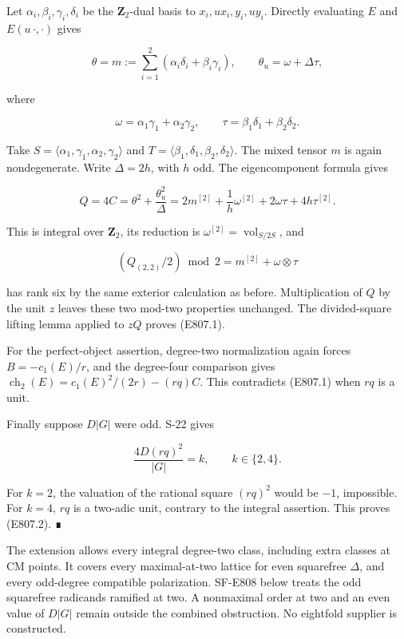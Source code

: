 Let \(\alpha_i,\beta_i,\gamma_i,\delta_i\) be the \(\mathbf Z_2\)-dual
basis to \(x_i,ux_i,y_i,uy_i\). Directly evaluating \(E\) and
\(E(u\,\cdot,\cdot)\) gives

\[
 \theta=m:=\sum_{i=1}^2(\alpha_i\delta_i+\beta_i\gamma_i),
 \qquad
 \theta_u=\omega+\Delta\tau,
 \tag{E807.4}
\]

where

\[
 \omega=\alpha_1\gamma_1+\alpha_2\gamma_2,\qquad
 \tau=\beta_1\delta_1+\beta_2\delta_2.
\]

Take \(S=\langle\alpha_1,\gamma_1,\alpha_2,\gamma_2\rangle\) and
\(T=\langle\beta_1,\delta_1,\beta_2,\delta_2\rangle\). The mixed tensor
\(m\) is again nondegenerate. Write \(\Delta=2h\), with \(h\) odd. The
eigencomponent formula gives

\[
 Q=4C=\theta^2+\frac{\theta_u^2}{\Delta}
   =2m^{[2]}+\frac1h\omega^{[2]}
          +2\omega\tau+4h\tau^{[2]}.
 \tag{E807.5}
\]

This is integral over \(\mathbf Z_2\), its reduction is
\(\omega^{[2]}=\operatorname{vol}_{S/2S}\), and

\[
 (Q_{(2,2)}/2)\bmod2=m^{[2]}+\omega\otimes\tau
\]

has rank six by the same exterior calculation as before. Multiplication
of \(Q\) by the unit \(z\) leaves these two mod-two properties
unchanged. The divided-square lifting lemma applied to \(zQ\) proves
(E807.1).

For the perfect-object assertion, degree-two normalization again forces
\(B=-c_1(E)/r\), and the degree-four comparison gives
\(\operatorname{ch}_2(E)=c_1(E)^2/(2r)-(rq)C\). This contradicts
(E807.1) when \(rq\) is a unit.

Finally suppose \(D|G|\) were odd. S-22 gives

\[
 \frac{4D(rq)^2}{|G|}=k,\qquad k\in\{2,4\}.
\]

For \(k=2\), the valuation of the rational square \((rq)^2\) would be
\(-1\), impossible. For \(k=4\), \(rq\) is a two-adic unit, contrary to
the integral assertion. This proves (E807.2). ∎

The extension allows every integral degree-two class, including extra
classes at CM points. It covers every maximal-at-two lattice for even
squarefree \(\Delta\), and every odd-degree compatible polarization.
SF-E808 below treats the odd squarefree radicands ramified at two. A
nonmaximal order at two and an even value of \(D|G|\) remain outside the
combined obstruction. No eightfold supplier is constructed.

